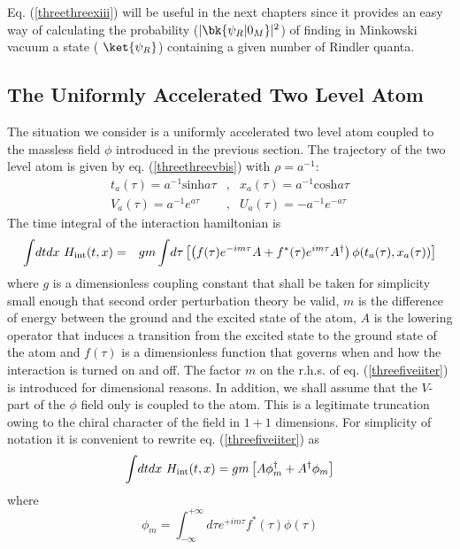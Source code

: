 \documentclass[12pt]{article}
\begin{document}
Eq. (\ref{threethreexiii}) will be  useful in the next chapters since
it provides an easy way of calculating the probability ($\vert \bk{\psi_R
\vert 0_M} \vert^2$) of
finding in Minkowski vacuum a state ( $\ket{\psi_R}$) containing a given number
of
Rindler quanta.

\subsection{The Uniformly Accelerated Two Level Atom}

The situation we consider is a uniformly accelerated two level atom coupled
to the massless field $\phi$ introduced in the previous section.
The trajectory of the two level atom is
given by eq. (\ref{threethreevbis}) with $\rho =a^{-1}$:
\begin{eqnarray} t_a (\tau) =a^{-1}
\mbox{sinh} a \tau & ,&  x_a (\tau) =a^{-1} \mbox{cosh} a \tau
\nonumber\\
V_a (\tau) = a^{-1} e^{a\tau} & ,& U_a (\tau) = -a^{-1} e^{-a\tau}
\label{threefivexiibis}
\end{eqnarray}
The time integral of the interaction hamiltonian is
\begin{eqnarray} \int\! dt dx\ H_{\rm int} (t,x) &=& g m \int\!
d\tau \left[ \left( f(\tau) e^{-im\tau} A  +
f^*(\tau) e^{im\tau} A^{\dagger}
\right) \phi(t_a(\tau),x_a (\tau)) \right]
\label{threefiveiiter} \end{eqnarray}
where $g$ is a dimensionless coupling constant that shall be
taken for simplicity  small enough that second order perturbation theory be
valid, $m$ is the difference of energy between the ground and the
excited state
of the atom,
$A$ is the lowering operator that induces a transition
 from the excited state to the
ground state of the atom
and $f(\tau)$ is a dimensionless function that governs when and how the
interaction
is turned on and off. The factor $m$ on the r.h.s. of eq.
(\ref{threefiveiiter})  is
introduced for dimensional reasons.
In addition, we shall assume that the $V$-part of the $\phi$ field only
is coupled to the atom. This is a legitimate truncation owing to the
chiral character of the field in $1+1$ dimensions.
For simplicity of notation it is convenient to rewrite
eq. (\ref{threefiveiiter})
 as
\begin{eqnarray} \int\! dt dx\ H_{\rm int} (t,x) =
 g m  \left[ A \phi_m^\dagger  +  A^\dagger \phi_m
\right] \label{threefiveii} \end{eqnarray} where
\begin{equation} \phi_m = \int_{-\infty}^{+\infty}\!
d\tau e^{+im\tau} f^*(\tau) \phi(\tau) \label{threefiveiii} \end{equation}
\end{document}
